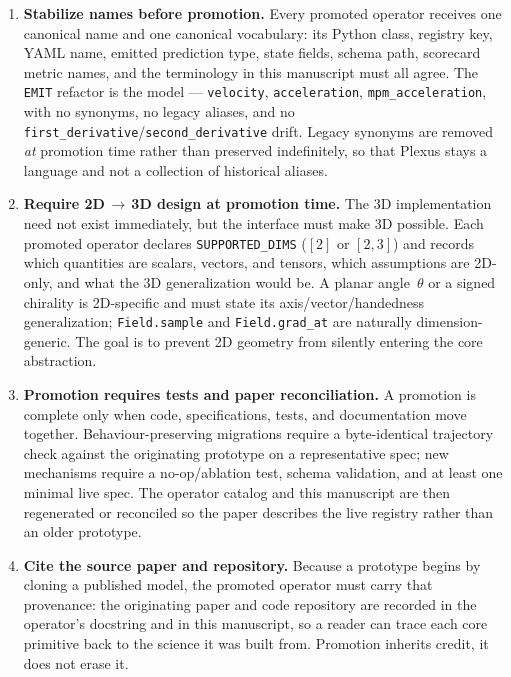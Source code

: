 \documentclass[11pt]{article}
\newcommand{\code}[1]{\texttt{#1}}
\begin{document}
\begin{enumerate}
\item \textbf{Stabilize names before promotion.} Every promoted operator receives one
canonical name and one canonical vocabulary: its Python class, registry key, YAML
name, emitted prediction type, state fields, schema path, scorecard metric names, and
the terminology in this manuscript must all agree. The \code{EMIT} refactor is the
model --- \code{velocity}, \code{acceleration}, \code{mpm\_acceleration}, with no
synonyms, no legacy aliases, and no \code{first\_derivative}/\code{second\_derivative}
drift. Legacy synonyms are removed \emph{at} promotion time rather than preserved
indefinitely, so that Plexus stays a language and not a collection of historical
aliases.

\item \textbf{Require 2D\,$\to$\,3D design at promotion time.} The 3D implementation
need not exist immediately, but the interface must make 3D possible. Each promoted
operator declares \code{SUPPORTED\_DIMS} ($[2]$ or $[2,3]$) and records which
quantities are scalars, vectors, and tensors, which assumptions are 2D-only, and what
the 3D generalization would be. A planar angle~$\theta$ or a signed chirality is
2D-specific and must state its axis/vector/handedness generalization; \code{Field.sample}
and \code{Field.grad\_at} are naturally dimension-generic. The goal is to prevent 2D
geometry from silently entering the core abstraction.

\item \textbf{Promotion requires tests and paper reconciliation.} A promotion is
complete only when code, specifications, tests, and documentation move together.
Behaviour-preserving migrations require a byte-identical trajectory check against the
originating prototype on a representative spec; new mechanisms require a no-op/ablation
test, schema validation, and at least one minimal live spec. The operator catalog and
this manuscript are then regenerated or reconciled so the paper describes the live
registry rather than an older prototype.

\item \textbf{Cite the source paper and repository.} Because a prototype begins by
cloning a published model, the promoted operator must carry that provenance: the
originating paper and code repository are recorded in the operator's docstring and in
this manuscript, so a reader can trace each core primitive back to the science it was
built from. Promotion inherits credit, it does not erase it.
\end{enumerate}
\end{document}
